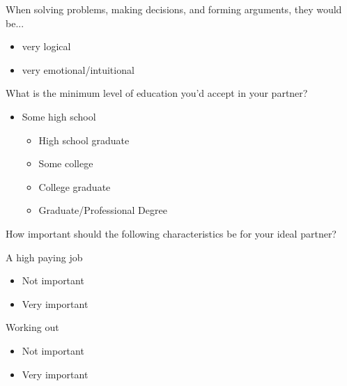 \documentclass[twoside]{report}
\begin{document}
\begin{multicols}{2}
 When solving problems, making decisions, and forming arguments, they would be...

 \begin{itemize}
  \item
        very logical
 \end{itemize}

 \begin{itemize}
  \item
        very emotional/intuitional
 \end{itemize}

 What is the minimum level of education you'd accept in your partner?

 \begin{itemize}
  \item
        Some high school

        \begin{itemize}
         \item
               High school graduate
        \end{itemize}

        \begin{itemize}
         \item
               Some college
         \item
               College graduate
         \item
               Graduate/Professional Degree
        \end{itemize}
 \end{itemize}

 How important should the following characteristics be for your ideal partner?

 A high paying job

 \begin{itemize}
  \item
        Not important
 \end{itemize}

 \begin{itemize}
  \item
        Very important
 \end{itemize}

 Working out

 \begin{itemize}
  \item
        Not important
 \end{itemize}

 \begin{itemize}
  \item
        Very important
 \end{itemize}


\end{multicols}
\end{document}
